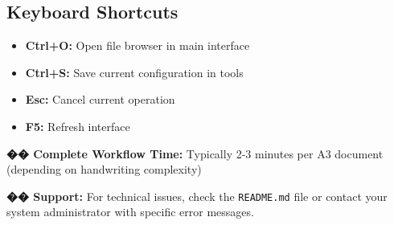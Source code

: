 \documentclass[11pt,a4paper]{article}
\begin{document}
\subsection*{\faKeyboard\space Keyboard Shortcuts}
\begin{itemize}[leftmargin=*,itemsep=0pt]
    \item \textbf{Ctrl+O:} Open file browser in main interface
    \item \textbf{Ctrl+S:} Save current configuration in tools
    \item \textbf{Esc:} Cancel current operation
    \item \textbf{F5:} Refresh interface
\end{itemize}

\begin{tcolorbox}[colback=primary!5,colframe=primary]
\textbf{�� Complete Workflow Time:} Typically 2-3 minutes per A3 document (depending on handwriting complexity)
\end{tcolorbox}

\begin{tcolorbox}[colback=success!5,colframe=success]
\textbf{�� Support:} For technical issues, check the \texttt{README.md} file or contact your system administrator with specific error messages.
\end{tcolorbox}
\end{document}
